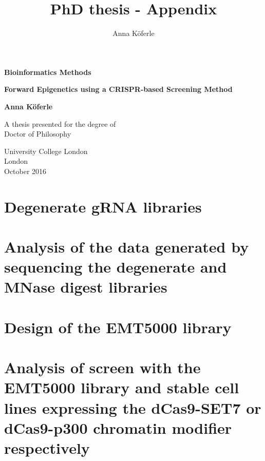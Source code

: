 \documentclass[12pt]{report}
\begin{document}
\title{PhD thesis - Appendix}
\author{Anna Köferle}

\begin{titlepage}
    \begin{center}
        \vspace*{3cm}
        
		\begin{Huge}
		\textbf{Bioinformatics Methods}
		\end{Huge}   
		 \vspace{3cm}      
		 
		 
		\begin{Huge}
		\textbf{Forward Epigenetics using a CRISPR-based Screening Method}
		\end{Huge}        
		
        \vspace{3.cm}      
        
        {\Large \textbf{Anna Köferle}}
        
        \vfill
        
        A thesis presented for the degree of\\
        Doctor of Philosophy
        
        \vspace{1.5cm}
        
        
        University College London\\
        London\\
        October 2016\\
        
        
    \end{center}
\end{titlepage}

\onehalfspacing

\tableofcontents


\chapter{Degenerate gRNA libraries}
\label{ch:degenerate-libraries}


\chapter{Analysis of the data generated by sequencing the degenerate and MNase digest libraries}
\label{ch:libraries-analysis}


\chapter{Design of the EMT5000 library}
\label{ch:EMT5000_library}


\chapter{Analysis of screen with the EMT5000 library and stable cell lines expressing the dCas9-SET7 or dCas9-p300 chromatin modifier respectively}
\label{ch:EMT5000-screen}





\end{document}

